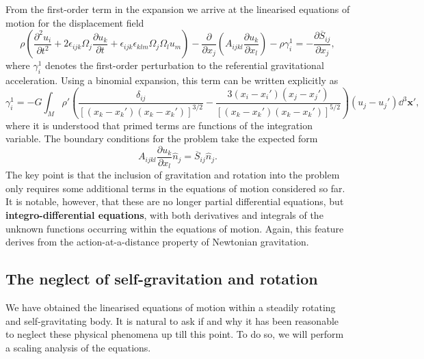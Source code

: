 From the first-order term in the expansion we arrive at the linearised equations of motion for the displacement field
\begin{equation}
\rho\left(\frac{\partial^{2}u_{i}}{\partial t^{2}}+2\epsilon_{ijk}\Omega_{j}\frac{\partial u_{k}}{\partial t}+
\epsilon_{ijk}\epsilon_{klm}\Omega_{j}\Omega_{l}u_{m}\right)-\frac{\partial}{\partial x_{j}}\left(A_{ijkl}
\frac{\partial u_{k}}{\partial x_{l}}\right)-\rho\gamma_{i}^{1}=-\frac{\partial\overline{S}_{ij}}{\partial x_{j}},
\label{eq:44}
\end{equation}
where $\gamma_{i}^{1}$ denotes the first-order perturbation to the referential gravitational acceleration. 
Using a binomial expansion, this term can be written explicitly as
\begin{equation}
\gamma_{i}^{1}=-G\int_{M}\rho'\left(\frac{\delta_{ij}}{[(x_{k}-x_{k}')(x_{k}-x_{k}')]^{3/2}}-
\frac{3(x_{i}-x_{i}')(x_{j}-x_{j}')}{[(x_{k}-x_{k}')(x_{k}-x_{k}')]^{5/2}}\right)(u_{j}-u_{j}')\dd^{3}\mathbf{x}',
\label{eq:45}
\end{equation}
where it is understood that primed terms are functions of the integration variable. The boundary conditions 
for the problem take the expected form
\begin{equation}
A_{ijkl}\frac{\partial u_{k}}{\partial x_{l}}\hat{n}_{j}=\overline{S}_{ij}\hat{n}_{j}.
\label{eq:46}
\end{equation}
The key point is that the inclusion of gravitation and rotation into the problem only requires some additional 
terms in the equations of motion considered so far. It is notable, however, that these are no longer partial 
differential equations, but \textbf{integro-differential equations}, with 
both derivatives and integrals of the unknown functions occurring within the equations of motion. 
Again, this feature derives from the action-at-a-distance property of Newtonian gravitation.

\subsection*{The neglect of self-gravitation and rotation}

We have obtained the linearised equations of motion within a steadily rotating and self-gravitating body. 
It is natural to ask if and why it has been reasonable to neglect these physical phenomena up till this point. 
To do so, we will perform a scaling analysis of the equations. 

